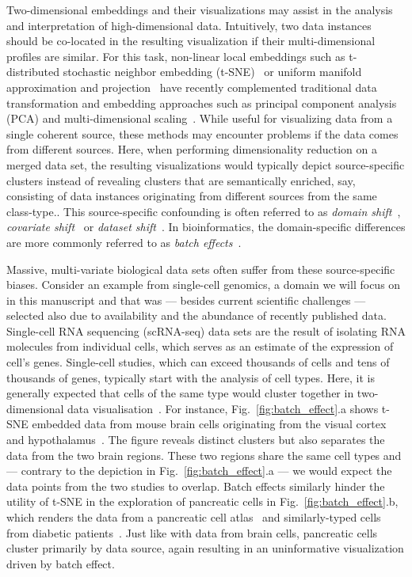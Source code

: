 \documentclass[runningheads]{llncs}
\begin{document}
Two-dimensional embeddings and their visualizations may assist in the analysis
and interpretation of high-dimensional data. Intuitively, two data instances
should be co-located in the resulting visualization if their multi-dimensional
profiles are similar. For this task, non-linear local embeddings such as
t-distributed stochastic neighbor embedding (t-SNE)~\cite{tsne} or uniform
manifold approximation and projection~\cite{umap} have recently complemented
traditional data transformation and embedding approaches such as principal
component analysis (PCA) and multi-dimensional
scaling~\cite{distill,umap_single_cell}. While useful for visualizing data
from a single coherent source, these methods may encounter problems if the data
comes from different sources. Here, when performing dimensionality reduction on a merged data set, the resulting visualizations would typically
depict source-specific clusters instead of revealing clusters that are
semantically enriched, say, consisting of data instances originating from
different sources from the same class-type.. This source-specific confounding is often referred to as {\em domain
shift}~\cite{domain_shift}, {\em covariate shift}~\cite{covariate_shift} or
{\em dataset shift}~\cite{dataset_shift}. In bioinformatics, the
domain-specific differences are more commonly referred to as {\em batch
effects}~\cite{cca,mnn,seurat}.

Massive, multi-variate biological data sets often suffer from these source-specific
biases. Consider an example from single-cell genomics, a domain we will focus
on in this manuscript and that was --- besides current scientific challenges
--- selected also due to availability and the abundance of recently published
data. Single-cell RNA sequencing (scRNA-seq) data sets are the result of isolating RNA molecules from individual cells,
which serves as an estimate of the expression of cell's genes.
Single-cell studies, which can exceed thousands of cells and tens of thousands of genes,
typically start with the analysis of cell types. Here, it is generally expected that
cells of the same type would cluster together in two-dimensional data
visualisation~\cite{seurat}. For instance, Fig.~\ref{fig:batch_effect}.a shows
t-SNE embedded data from mouse brain cells originating from the visual
cortex~\cite{hrvatin2018} and hypothalamus~\cite{chen2017}. The figure reveals
distinct clusters but also separates the data from the two brain regions. These
two regions share the same cell types and --- contrary to the depiction in
Fig.~\ref{fig:batch_effect}.a --- we would expect the data points from the two
studies to overlap. Batch effects similarly hinder the utility of t-SNE in
the exploration of pancreatic cells in Fig.~\ref{fig:batch_effect}.b, which
renders the data from a pancreatic cell atlas~\cite{baron2016} and similarly-typed
cells from diabetic patients~\cite{xin2016}. Just like with data from brain
cells, pancreatic cells cluster primarily by data source, again
resulting in an uninformative visualization driven by batch
effect.
\end{document}
